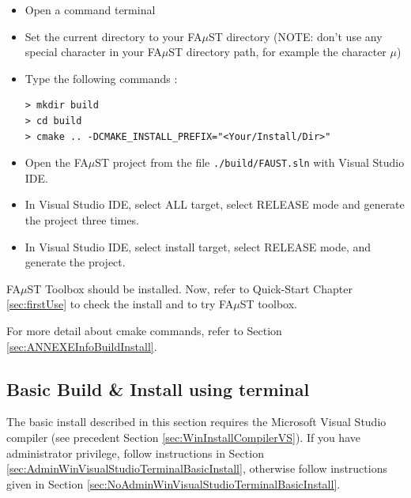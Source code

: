 \begin{itemize}

\item Open a command terminal
\item Set the current directory to your FA$\mu$ST directory (NOTE: don't use any special character in your FA$\mu$ST directory path, for example the character $\mu$)
\item Type the following commands :

\lstset{style=customBash} 
\begin{lstlisting}
> mkdir build
> cd build
> cmake .. -DCMAKE_INSTALL_PREFIX="<Your/Install/Dir>"
\end{lstlisting}

\item Open the FA$\mu$ST project from the file \texttt{./build/FAUST.sln} with Visual Studio IDE.
\item In Visual Studio IDE, select ALL target, select RELEASE mode and generate the project three times.
\item In Visual Studio IDE, select install target, select RELEASE mode, and generate the project.
\end{itemize}

FA$\mu$ST Toolbox should be installed. Now, refer to Quick-Start Chapter \ref{sec:firstUse} to check the install and to try FA$\mu$ST toolbox.

For more detail about cmake commands, refer to Section \ref{sec:ANNEXEInfoBuildInstall}.

\subsection{Basic Build \& Install using terminal}\label{sec:WinVisualStudioTerminalBasicInstall}
The basic install described in this section requires the Microsoft Visual Studio compiler (see precedent Section \ref{sec:WinInstallCompilerVS}).
If you have administrator privilege, follow instructions in Section \ref{sec:AdminWinVisualStudioTerminalBasicInstall}, otherwise follow instructions given in Section \ref{sec:NoAdminWinVisualStudioTerminalBasicInstall}.

